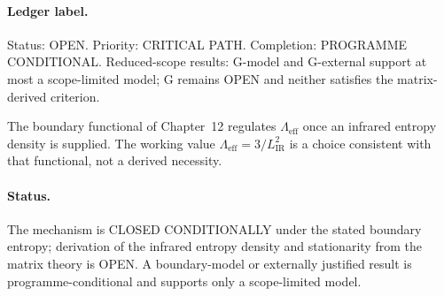 \paragraph{Ledger label.}
Status: OPEN. Priority: CRITICAL PATH. Completion:
PROGRAMME CONDITIONAL. Reduced-scope results: G-model and
G-external support at most a scope-limited model; G remains OPEN
and neither satisfies the matrix-derived criterion.

The boundary functional of Chapter~12 regulates \(\Lambda_{\mathrm{eff}}\)
once an infrared entropy density is supplied. The working value
\(\Lambda_{\mathrm{eff}}=3/L_{\mathrm{IR}}^2\) is a choice consistent with
that functional, not a derived necessity.

\paragraph{Status.}
The mechanism is CLOSED CONDITIONALLY under the stated boundary
entropy; derivation of the infrared entropy density and stationarity
from the matrix theory is OPEN. A boundary-model or externally
justified result is programme-conditional and supports only a
scope-limited model.

